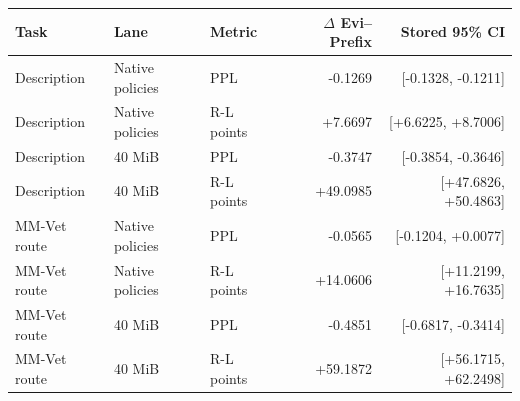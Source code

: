 \begin{tabular}{lllrr}
\toprule
Task & Lane & Metric & $\Delta$ Evi--Prefix & Stored 95\% CI\\\midrule
Description & Native policies & PPL & -0.1269 & [-0.1328, -0.1211]\\
Description & Native policies & R-L points & +7.6697 & [+6.6225, +8.7006]\\
Description & 40 MiB & PPL & -0.3747 & [-0.3854, -0.3646]\\
Description & 40 MiB & R-L points & +49.0985 & [+47.6826, +50.4863]\\
MM-Vet route & Native policies & PPL & -0.0565 & [-0.1204, +0.0077]\\
MM-Vet route & Native policies & R-L points & +14.0606 & [+11.2199, +16.7635]\\
MM-Vet route & 40 MiB & PPL & -0.4851 & [-0.6817, -0.3414]\\
MM-Vet route & 40 MiB & R-L points & +59.1872 & [+56.1715, +62.2498]\\
\bottomrule
\end{tabular}
